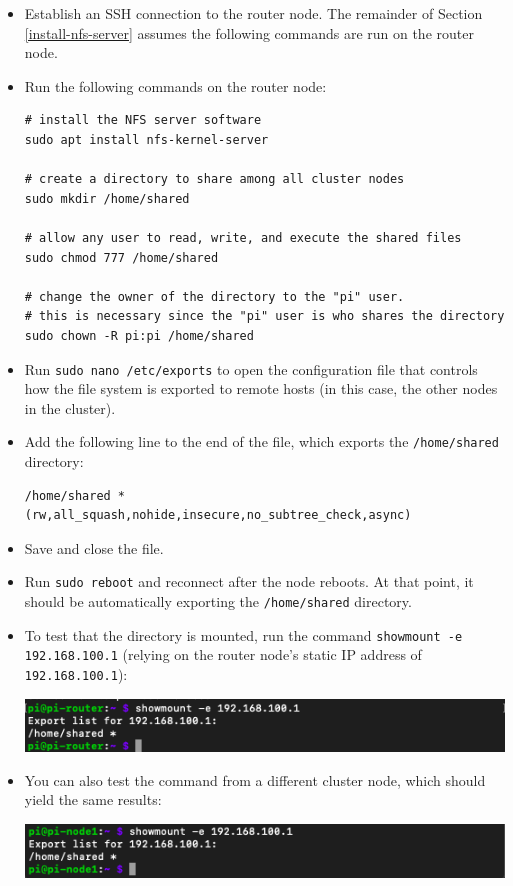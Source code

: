 \documentclass{article}
\begin{document}
\begin{itemize}
    \item Establish an SSH connection to the router node. The remainder of Section \ref{install-nfs-server} assumes the following commands are run on the router node. 
    
    \item Run the following commands on the router node:
\begin{verbatim}
# install the NFS server software
sudo apt install nfs-kernel-server

# create a directory to share among all cluster nodes
sudo mkdir /home/shared

# allow any user to read, write, and execute the shared files
sudo chmod 777 /home/shared

# change the owner of the directory to the "pi" user.
# this is necessary since the "pi" user is who shares the directory
sudo chown -R pi:pi /home/shared
\end{verbatim}    

    \item Run \texttt{sudo nano /etc/exports} to open the configuration file that controls how the file system is exported to remote hosts (in this case, the other nodes in the cluster).
    
    \item Add the following line to the end of the file, which exports the \texttt{/home/shared} directory:
\begin{verbatim}
/home/shared *(rw,all_squash,nohide,insecure,no_subtree_check,async)
\end{verbatim}

    \item Save and close the file.

    \item Run \texttt{sudo reboot} and reconnect after the node reboots. At that point, it should be automatically exporting the \texttt{/home/shared} directory.
    
    \item To test that the directory is mounted, run the command \texttt{showmount -e 192.168.100.1} (relying on the router node's static IP address of \texttt{192.168.100.1}):
    
    \includegraphics[width=\textwidth]{images/showmount-router.png}
    
    \item You can also test the command from a different cluster node, which should yield the same results:

    \includegraphics[width=\textwidth]{images/showmount-nonrouter.png}
\end{itemize}
\end{document}
